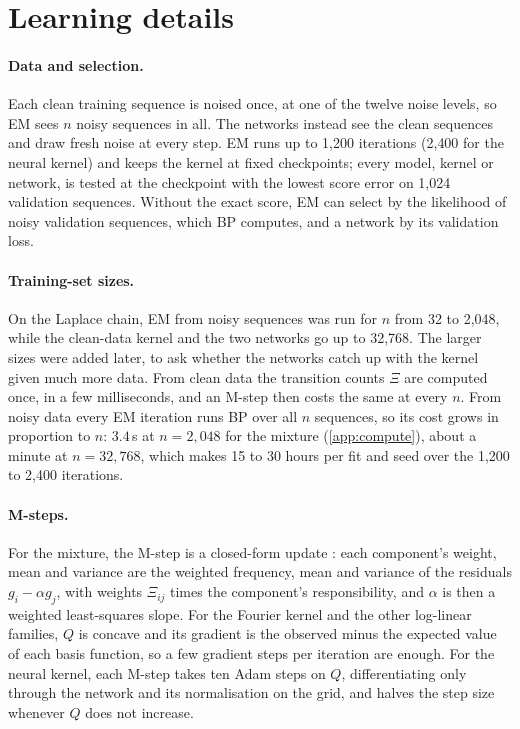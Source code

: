 \documentclass{article}
\begin{document}
\section{Learning details}
\label{app:em}

\paragraph{Data and selection.} Each clean training sequence is noised once, at one of the twelve noise levels, so EM
sees $n$ noisy sequences in all. The networks instead see the clean sequences and draw fresh noise at every step. EM runs
up to 1{,}200 iterations (2{,}400 for the neural kernel) and keeps the kernel at fixed checkpoints; every model, kernel or
network, is tested at the checkpoint with the lowest score error on 1{,}024 validation sequences. Without the exact
score, EM can select by the likelihood of noisy validation sequences, which BP computes, and a network by its validation
loss.

\paragraph{Training-set sizes.} On the Laplace chain, EM from noisy sequences was run for $n$ from 32 to 2{,}048, while
the clean-data kernel and the two networks go up to 32{,}768. The larger sizes were added later, to ask whether the
networks catch up with the kernel given much more data. From clean data
the transition counts $\Xi$ are computed once, in a few milliseconds, and an M-step then costs the same at every $n$.
From noisy data every EM iteration runs BP over all $n$ sequences, so its cost grows in proportion to $n$: $3.4$\,s at
$n=2{,}048$ for the mixture (\cref{app:compute}), about a minute at $n=32{,}768$, which makes 15 to 30 hours per fit and
seed over the 1{,}200 to 2{,}400 iterations. 

\paragraph{M-steps.} For the mixture, the M-step is a closed-form update \cite{meng1993maximum}: each component's weight,
mean and variance are the weighted frequency, mean and variance of the residuals $g_i-\alpha g_j$, with weights $\Xi_{ij}$
times the component's responsibility, and $\alpha$ is then a weighted least-squares slope. For the Fourier kernel and
the other log-linear families, $Q$ is concave and its gradient is the observed minus the expected value of each basis
function, so a few gradient steps per iteration are enough. For the neural kernel, each M-step takes ten Adam steps on
$Q$, differentiating only through the network and its normalisation on the grid, and halves the step size whenever $Q$
does not increase.
\end{document}

